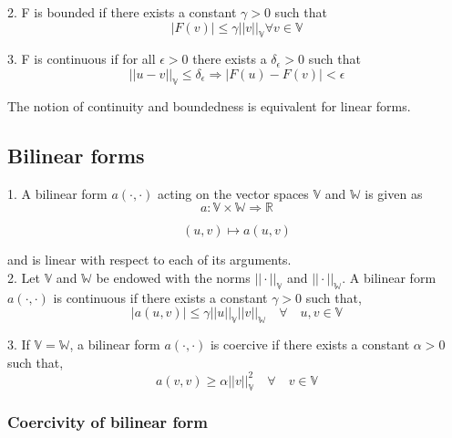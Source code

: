 \documentclass[a4paper,openany]{book}
\begin{document}
\begin{appendices}
2. F is bounded if there exists a constant $\gamma > 0$ such that
\begin{equation} 
|F(v)| \leq \gamma ||v||_\mathbb{V} \forall v \in \mathbb{V}
\end{equation}

3. F is continuous if for all $\epsilon > 0$ there exists a $\delta_\epsilon > 0$ such that \\
\begin{equation}
||u - v||_\mathbb{V} \leq \delta_\epsilon \Rightarrow  |F(u) - F(v)| < \epsilon
\end{equation}

The notion of continuity and boundedness is equivalent for linear forms.

\subsection{Bilinear forms}

1. A bilinear form $a(\cdot,\cdot)$ acting on the vector spaces $\mathbb{V}$ and $\mathbb{W}$ is given as
\begin{equation}
a : \mathbb{V} \times \mathbb{W} \Rightarrow \mathbb{R}
\end{equation}

\begin{equation}
(u,v) \mapsto a(u,v)
\end{equation}

and is linear with respect to each of its arguments.\\

2. Let $\mathbb{V}$ and $\mathbb{W}$ be endowed with the norms $||\cdot||_\mathbb{V}$ and $||\cdot||_\mathbb{W}$. A bilinear form $a(\cdot,\cdot)$ is continuous if there exists a constant $\gamma > 0$ such that,
\begin{equation}
|a(u,v)| \leq \gamma ||u||_\mathbb{V} ||v||_\mathbb{W} \quad \forall \quad u,v \in \mathbb{V}
\end{equation}

3. If $\mathbb{V} = \mathbb{W}$, a bilinear form $a(\cdot,\cdot)$ is coercive if there exists a constant $\alpha > 0$ such that,
\begin{equation}
a(v,v) \geq \alpha ||v||_\mathbb{V}^2  \quad \forall \quad v \in  \mathbb{V}
\end{equation}

\subsubsection{Coercivity of bilinear form} \label{Coercivity_constant}


\end{appendices}
\end{document}

